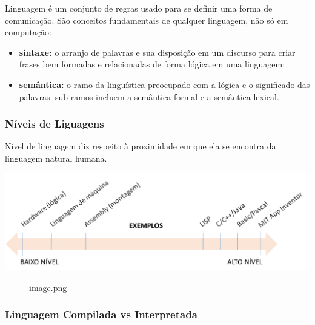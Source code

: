 \documentclass[12pt,a4paper]{article}
\providecommand{\tightlist}{%
      \setlength{\itemsep}{0pt}\setlength{\parskip}{0pt}}
\begin{document}
    Linguagem é um conjunto de regras usado para se definir uma forma de
comunicação. São conceitos fundamentais de qualquer linguagem, não só em
computação:

\begin{itemize}
\tightlist
\item
  \textbf{sintaxe:} o arranjo de palavras e sua disposição em um
  discurso para criar frases bem formadas e relacionadas de forma lógica
  em uma linguagem;
\item
  \textbf{semântica:} o ramo da linguística preocupado com a lógica e o
  significado das palavras. sub-ramos incluem a semântica formal e a
  semântica lexical.
\end{itemize}

    \hypertarget{nuxedveis-de-liguagens}{%
\subsubsection{Níveis de Liguagens}\label{nuxedveis-de-liguagens}}

    Nível de linguagem diz respeito à proximidade em que ela se encontra da
linguagem natural humana.

\includegraphics{"figs/image03.png"}

    \begin{figure}
\centering
\caption{image.png}
\end{figure}

    \hypertarget{linguagem-compilada-vs-interpretada}{%
\subsubsection{Linguagem Compilada vs
Interpretada}\label{linguagem-compilada-vs-interpretada}}
\end{document}

